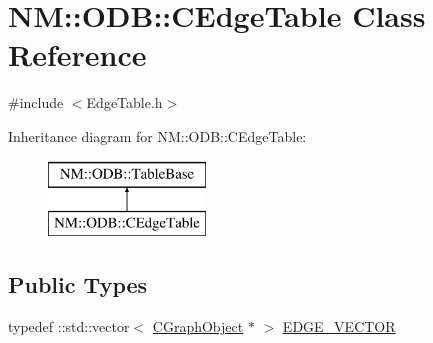 \hypertarget{class_n_m_1_1_o_d_b_1_1_c_edge_table}{}\section{N\+M\+:\+:O\+D\+B\+:\+:C\+Edge\+Table Class Reference}
\label{class_n_m_1_1_o_d_b_1_1_c_edge_table}


{\ttfamily \#include $<$Edge\+Table.\+h$>$}

Inheritance diagram for N\+M\+:\+:O\+D\+B\+:\+:C\+Edge\+Table\+:\begin{figure}[H]
\begin{center}
\leavevmode
\includegraphics[height=2.000000cm]{class_n_m_1_1_o_d_b_1_1_c_edge_table}
\end{center}
\end{figure}
\subsection*{Public Types}
\begin{DoxyCompactItemize}
\item 
typedef \+::std\+::vector$<$ \hyperlink{class_n_m_1_1_o_d_b_1_1_c_graph_object}{C\+Graph\+Object} $\ast$ $>$ \hyperlink{class_n_m_1_1_o_d_b_1_1_c_edge_table_acb09088dea6dd356999095d7c7cb977a}{E\+D\+G\+E\+\_\+\+V\+E\+C\+T\+O\+R}
\end{DoxyCompactItemize}
